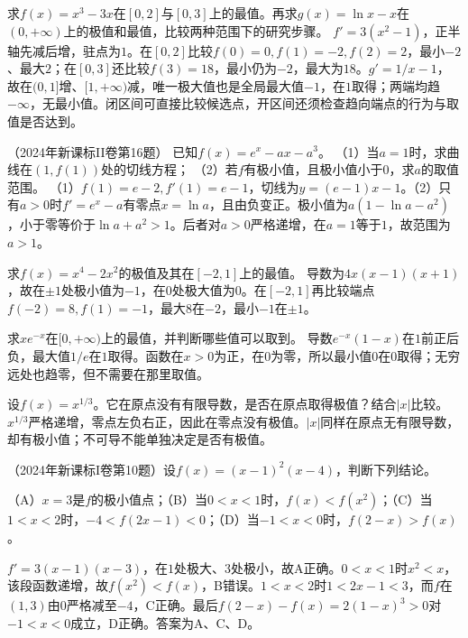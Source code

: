 求\(f(x)=x^3-3x\)在\([0,2]\)与\([0,3]\)上的最值。再求\(g(x)=\ln x-x\)在\((0,+\infty)\)上的极值和最值，比较两种范围下的研究步骤。
\solutionanswer
\(f'=3(x^2-1)\)，正半轴先减后增，驻点为\(1\)。在\([0,2]\)比较\(f(0)=0,f(1)=-2,f(2)=2\)，最小\(-2\)、最大\(2\)；在\([0,3]\)还比较\(f(3)=18\)，最小仍为\(-2\)，最大为\(18\)。\(g'=1/x-1\)，故在\((0,1]\)增、\([1,+\infty)\)减，唯一极大值也是全局最大值\(-1\)，在\(1\)取得；两端均趋\(-\infty\)，无最小值。闭区间可直接比较候选点，开区间还须检查趋向端点的行为与取值是否达到。


（2024年新课标II卷第16题）
已知\(f(x)=e^x-ax-a^3\)。
（1）当\(a=1\)时，求曲线在\((1,f(1))\)处的切线方程；
（2）若\(f\)有极小值，且极小值小于\(0\)，求\(a\)的取值范围。
\solutionanswer
（1）\(f(1)=e-2,f'(1)=e-1\)，切线为\(y=(e-1)x-1\)。（2）只有\(a>0\)时\(f'=e^x-a\)有零点\(x=\ln a\)，且由负变正。极小值为\(a(1-\ln a-a^2)\)，小于零等价于\(\ln a+a^2>1\)。后者对\(a>0\)严格递增，在\(a=1\)等于\(1\)，故范围为\(a>1\)。


求\(f(x)=x^4-2x^2\)的极值及其在\([-2,1]\)上的最值。
\solutionanswer
导数为\(4x(x-1)(x+1)\)，故在\(\pm1\)处极小值为\(-1\)，在\(0\)处极大值为\(0\)。在\([-2,1]\)再比较端点\(f(-2)=8,f(1)=-1\)，最大\(8\)在\(-2\)，最小\(-1\)在\(\pm1\)。


求\(x e^{-x}\)在\([0,+\infty)\)上的最值，并判断哪些值可以取到。
\solutionanswer
导数\(e^{-x}(1-x)\)在\(1\)前正后负，最大值\(1/e\)在\(1\)取得。函数在\(x>0\)为正，在\(0\)为零，所以最小值\(0\)在\(0\)取得；无穷远处也趋零，但不需要在那里取值。


设\(f(x)=x^{1/3}\)。它在原点没有有限导数，是否在原点取得极值？结合\(|x|\)比较。
\solutionanswer
\(x^{1/3}\)严格递增，零点左负右正，因此在零点没有极值。\(|x|\)同样在原点无有限导数，却有极小值；不可导不能单独决定是否有极值。


（2024年新课标I卷第10题）设\(f(x)=(x-1)^2(x-4)\)，判断下列结论。

（A）\(x=3\)是\(f\)的极小值点；（B）当\(0<x<1\)时，\(f(x)<f(x^2)\)；（C）当\(1<x<2\)时，\(-4<f(2x-1)<0\)；（D）当\(-1<x<0\)时，\(f(2-x)>f(x)\)。
\par
\solutionanswer
\(f'=3(x-1)(x-3)\)，在\(1\)处极大、\(3\)处极小，故A正确。\(0<x<1\)时\(x^2<x\)，该段函数递增，故\(f(x^2)<f(x)\)，B错误。\(1<x<2\)时\(1<2x-1<3\)，而\(f\)在\((1,3)\)由\(0\)严格减至\(-4\)，C正确。最后\(f(2-x)-f(x)=2(1-x)^3>0\)对\(-1<x<0\)成立，D正确。答案为A、C、D。


